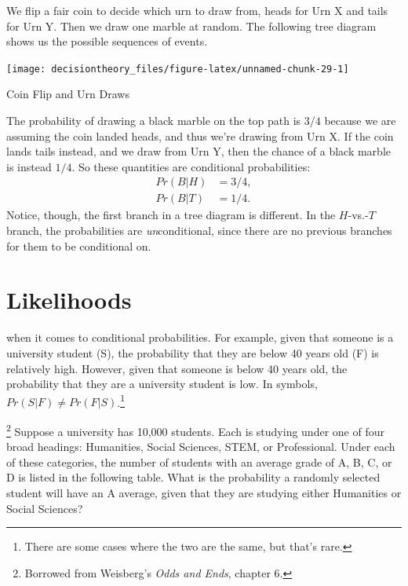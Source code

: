 \documentclass[]{tufte-book}
\begin{document}
We flip a fair coin to decide which urn to draw from, heads for Urn X and tails for Urn Y. Then we draw one marble at random. The following tree diagram shows us the possible sequences of events.

\begin{marginfigure}
\texttt{[image: decisiontheory\_files/figure-latex/unnamed-chunk-29-1]} \caption[Coin Flip and Urn Draws]{Coin Flip and Urn Draws}\label{fig:unnamed-chunk-29}
\end{marginfigure}

The probability of drawing a black marble on the top path is \(3/4\) because we are assuming the coin landed heads, and thus we're drawing from Urn X. If the coin lands tails instead, and we draw from Urn Y, then the chance of a black marble is instead \(1/4\). So these quantities are conditional probabilities:
\[
  \begin{aligned}
    Pr(B | H) &= 3/4,\\
    Pr(B | T) &= 1/4.
  \end{aligned}
\]
Notice, though, the first branch in a tree diagram is different. In the \(H\)-vs.-\(T\) branch, the probabilities are \emph{un}conditional, since there are no previous branches for them to be conditional on.

\hypertarget{likelihoods}{%
\section{Likelihoods}\label{likelihoods}}

 when it comes to conditional probabilities. For example, given that someone is a university student (S), the probability that they are below 40 years old (F) is relatively high. However, given that someone is below 40 years old, the probability that they are a university student is low. In symbols, \(Pr(S|F)\neq Pr(F|S)\).\footnote{There are some cases where the two are the same, but that's rare.}

\footnote{Borrowed from Weisberg's \emph{Odds and Ends}, chapter 6.} Suppose a university has 10,000 students. Each is studying under one of four broad headings: Humanities, Social Sciences, STEM, or Professional. Under each of these categories, the number of students with an average grade of A, B, C, or D is listed in the following table. What is the probability a randomly selected student will have an A average, given that they are studying either Humanities or Social Sciences?
\end{document}
